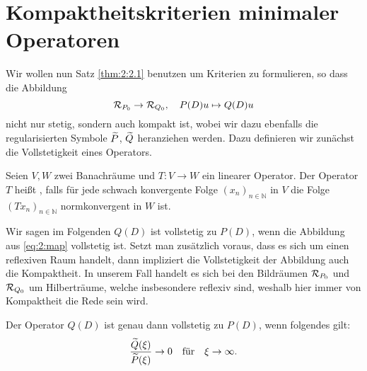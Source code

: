 \section{Kompaktheitskriterien minimaler Operatoren}
Wir wollen nun Satz \ref{thm:2:2.1} benutzen um Kriterien zu formulieren, so dass die Abbildung
\begin{equation}\label{eq:2:map}
\mathcal R_{P_0}\to\mathcal R_{Q_0},\quad P(D)u\mapsto Q(D)u
\end{equation}
nicht nur stetig, sondern auch kompakt ist, wobei wir dazu ebenfalls die regularisierten Symbole $\widetilde{P}$, $\widetilde{Q}$ heranziehen werden. Dazu definieren wir zunächst die Vollstetigkeit eines Operators.
\begin{df}
\item Seien $V,W$ zwei Banachräume und $T: V \rightarrow W$ ein linearer Operator. Der Operator $T$ heißt , falls für jede schwach konvergente Folge $(x_n)_{n \in \mathbb{N}}$ in $V$ die Folge $(Tx_n)_{n \in \mathbb{N}}$ normkonvergent in $W$ ist.
\end{df}
Wir sagen im Folgenden $Q(D)$ ist vollstetig zu $P(D)$, wenn die Abbildung aus \eqref{eq:2:map} vollstetig ist. Setzt man zusätzlich voraus, dass es sich um einen reflexiven Raum handelt, dann impliziert die Vollstetigkeit der Abbildung auch die Kompaktheit. In unserem Fall handelt es sich bei den Bildräumen $\mathcal R_{P_0}$ und $\mathcal R_{Q_0}$ um Hilberträume, welche insbesondere reflexiv sind, weshalb hier immer von Kompaktheit die Rede sein wird.
\begin{thm}\label{Abbildung kompakt}
Der Operator $Q(D)$ ist genau dann vollstetig zu $P(D)$,
wenn folgendes gilt:
\begin{equation}\label{eq:2:tozero}
\frac{\widetilde{Q}(\xi)}{\widetilde{P}(\xi)}\to0 \quad\text{für}\quad\xi\to\infty.
\end{equation}
\end{thm}
